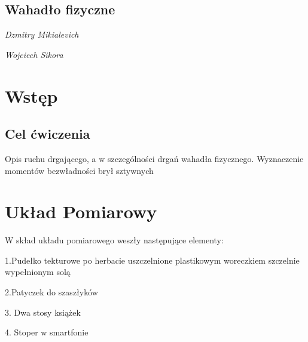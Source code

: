 \documentclass[]{article}
\begin{document}
\begin{figure}[tp!]
\end{figure}

\begin{center}
	\section*{Wahadło fizyczne}
	\emph{Dzmitry Mikialevich}
\end{center}
\begin{center}
	\emph{Wojciech Sikora}
\end{center}
\tableofcontents
\newpage

\section{Wstęp}

\subsection{Cel ćwiczenia}
Opis ruchu drgającego, a w szczególności drgań wahadła fizycznego. Wyznaczenie momentów
bezwładności brył sztywnych

    


\section{Układ Pomiarowy}
W skład układu pomiarowego weszły następujące elementy:
\newline

1.Pudełko tekturowe po herbacie uszczelnione plastikowym woreczkiem szczelnie wypełnionym solą

2.Patyczek do szaszłyków

3. Dwa stosy książek

4. Stoper w smartfonie
\end{document}
